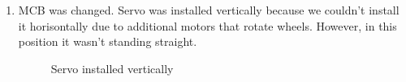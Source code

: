 \begin{enumerate}
\begin{enumerate}
        \item MCB was changed. Servo was installed vertically because we couldn't install it horisontally due to additional motors that rotate wheels. However, in this position it wasn't standing straight.
        \begin{figure}[H]
        	\begin{minipage}[h]{0.47\linewidth}
        	\end{minipage}
        	\hfill
        	\begin{minipage}[h]{0.47\linewidth}
        	\end{minipage}
        	\caption{Servo installed vertically}
        \end{figure}
        

\end{enumerate}
\end{enumerate}
